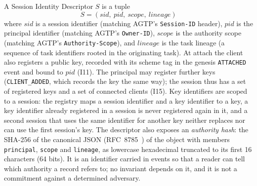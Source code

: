 \begin{definition}\label{def:sid}
A Session Identity Descriptor $S$ is a tuple
\[
S = (\mathit{sid},\ \mathit{pid},\ \mathit{scope},\ \mathit{lineage})
\]
where $\mathit{sid}$ is a session identifier (matching AGTP's
\texttt{Session-ID} header), $\mathit{pid}$ is the principal identifier
(matching AGTP's \texttt{Owner-ID}), $\mathit{scope}$ is the
authority scope (matching AGTP's \texttt{Authority-Scope}), and
$\mathit{lineage}$ is the task lineage (a sequence of task identifiers
rooted in the originating task). At attach the client also registers
a public key, recorded with its scheme tag in the genesis
\texttt{ATTACHED} event and bound to $\mathit{pid}$ (I11). The principal
may register further keys (\texttt{CLIENT\_ADDED}, which records the key
the same way); the session thus has a set of registered keys and a set of
connected clients (I15). Key identifiers are scoped to a session: the
registry maps a session identifier and a key identifier to a key, a key
identifier already registered in a session is never registered again in
it, and a second session that uses the same identifier for another key
neither replaces nor can use the first session's key. The descriptor also exposes an
\emph{authority hash}: the SHA-256 of the canonical JSON (RFC~8785~\cite{rundgren2020json}) of the
object with members \texttt{principal}, \texttt{scope} and
\texttt{lineage}, as lowercase hexadecimal truncated to its first 16
characters (64 bits). It is an identifier carried in events so that a
reader can tell which authority a record refers to; no invariant depends
on it, and it is not a commitment against a determined adversary.
\end{definition}

